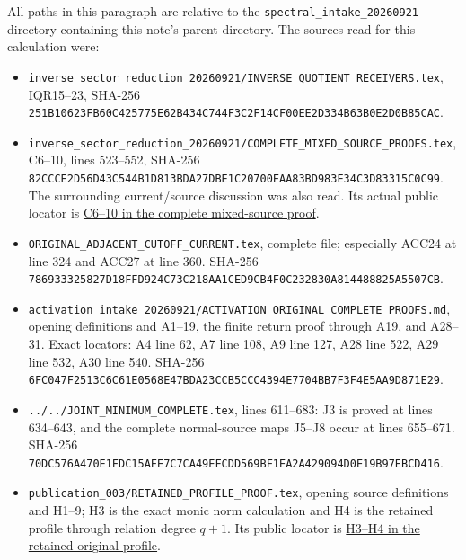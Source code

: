 \documentclass[11pt]{article}
\begin{document}
All paths in this paragraph are relative to the \nolinkurl{spectral_intake_20260921} directory containing this note's parent directory. The sources read for this calculation were:

\begin{itemize}
\tightlist
\item
  \nolinkurl{inverse_sector_reduction_20260921/INVERSE_QUOTIENT_RECEIVERS.tex}, IQR15--23, SHA-256 \nolinkurl{251B10623FB60C425775E62B434C744F3C2F14CF00EE2D334B63B0E2D0B85CAC}.
\item
  \nolinkurl{inverse_sector_reduction_20260921/COMPLETE_MIXED_SOURCE_PROOFS.tex}, C6--10, lines 523--552, SHA-256 \nolinkurl{82CCCE2D56D43C544B1D813BDA27DBE1C20700FAA83BD983E34C3D83315C0C99}. The surrounding current/source discussion was also read. Its actual public locator is \href{https://github.com/KokunoYumeto/zeta-function-research-reader/blob/78ed538f7c00121ab66e9e8adbefc0612c118db8/workbenches/splitzero-tandem/continuations/20260921-mixed-family-proof-source/COMPLETE_MIXED_SOURCE_PROOFS.tex\#L528}{C6--10 in the complete mixed-source proof}.
\item
  \nolinkurl{ORIGINAL_ADJACENT_CUTOFF_CURRENT.tex}, complete file; especially ACC24 at line 324 and ACC27 at line 360. SHA-256 \nolinkurl{786933325827D18FFD924C73C218AA1CED9CB4F0C232830A814488825A5507CB}.
\item
  \nolinkurl{activation_intake_20260921/ACTIVATION_ORIGINAL_COMPLETE_PROOFS.md}, opening definitions and A1--19, the finite return proof through A19, and A28--31. Exact locators: A4 line 62, A7 line 108, A9 line 127, A28 line 522, A29 line 532, A30 line 540. SHA-256 \nolinkurl{6FC047F2513C6C61E0568E47BDA23CCB5CCC4394E7704BB7F3F4E5AA9D871E29}.
\item
  \nolinkurl{../../JOINT_MINIMUM_COMPLETE.tex}, lines 611--683: J3 is proved at lines 634--643, and the complete normal-source maps J5--J8 occur at lines 655--671. SHA-256 \nolinkurl{70DC576A470E1FDC15AFE7C7CA49EFCDD569BF1EA2A429094D0E19B97EBCD416}.
\item
  \nolinkurl{publication_003/RETAINED_PROFILE_PROOF.tex}, opening source definitions and H1--9; H3 is the exact monic norm calculation and H4 is the retained profile through relation degree \(q+1\). Its public locator is \href{https://github.com/KokunoYumeto/zeta-function-research-reader/blob/0fd693c844aad9117e30ec447c59864a28af10f3/workbenches/splitzero-tandem/continuations/20260921-native-spectral-real-pair/003/RETAINED_PROFILE_PROOF.tex\#L19}{H3--H4 in the retained original profile}.
\end{itemize}
\end{document}

